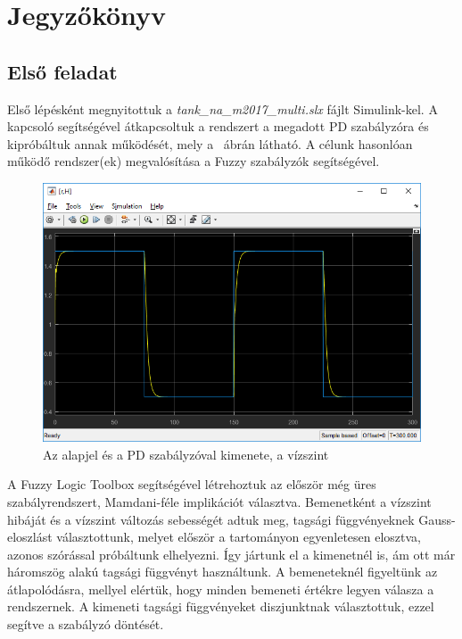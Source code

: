 \chapter{Jegyzőkönyv}

\section{Első feladat}
Első lépésként megnyitottuk a \textit{tank\_na\_m2017\_multi.slx} fájlt Simulink-kel. A kapcsoló segítségével átkapcsoltuk a rendszert a megadott PD szabályzóra és kipróbáltuk annak működését, mely a ~ábrán látható. A célunk hasonlóan működő rendszer(ek) megvalósítása a Fuzzy szabályzók segítségével.

\begin{figure}[!ht]
	\centering
	\includegraphics[width=150mm,keepaspectratio]{figures/m01/pd.png}
	\caption{Az alapjel és a PD szabályzóval kimenete, a vízszint} 
	\label{fig:pd}
\end{figure}

A Fuzzy Logic Toolbox segítségével létrehoztuk az először még üres szabályrendszert, Mamdani-féle implikációt választva. Bemenetként a vízszint hibáját és a vízszint változás sebességét adtuk meg, tagsági függvényeknek Gauss-eloszlást választottunk, melyet először a tartományon egyenletesen elosztva, azonos szórással próbáltunk elhelyezni. Így jártunk el a kimenetnél is, ám  ott már háromszög alakú tagsági függvényt használtunk. A bemeneteknél figyeltünk az átlapolódásra, mellyel elértük, hogy minden bemeneti értékre legyen válasza a rendszernek. A kimeneti tagsági függvényeket diszjunktnak választottuk, ezzel segítve a szabályzó döntését.

